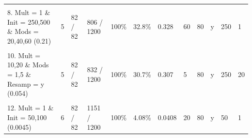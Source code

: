 \documentclass[
]{article}
\begin{document}
\begin{table}[!h]
{\begin{tabular}[t]{llllllllllll}
\cellcolor{gray!6}{7. Mult = 10,20 \& Mods = 10,20,40,60 \& Resamp = y \& Init = 50,100 (0.23)} & \cellcolor{gray!6}{7} & \cellcolor{gray!6}{82 / 82} & \cellcolor{gray!6}{948 / 1200} & \cellcolor{gray!6}{100\%} & \cellcolor{gray!6}{21\%} & \cellcolor{gray!6}{0.21} & \cellcolor{gray!6}{10} & \cellcolor{gray!6}{90} & \cellcolor{gray!6}{y} & \cellcolor{gray!6}{50} & \cellcolor{gray!6}{20}\\
8. Mult = 1 \& Init = 250,500 \& Mods = 20,40,60 (0.21) & 5 & 82 / 82 & 806 / 1200 & 100\% & 32.8\% & 0.328 & 60 & 80 & y & 250 & 1\\
\cellcolor{gray!6}{9. Mult = 10,20 \& Mods = 1,5 \& Resamp = n \& Mods = 1 \& Init = 50,100 (0.078)} & \cellcolor{gray!6}{6} & \cellcolor{gray!6}{82 / 82} & \cellcolor{gray!6}{1139 / 1200} & \cellcolor{gray!6}{100\%} & \cellcolor{gray!6}{5.08\%} & \cellcolor{gray!6}{0.0508} & \cellcolor{gray!6}{1} & \cellcolor{gray!6}{90} & \cellcolor{gray!6}{n} & \cellcolor{gray!6}{50} & \cellcolor{gray!6}{20}\\
10. Mult = 10,20 \& Mods = 1,5 \& Resamp = y (0.054) & 5 & 82 / 82 & 832 / 1200 & 100\% & 30.7\% & 0.307 & 5 & 80 & y & 250 & 20\\
\addlinespace
\cellcolor{gray!6}{11. Mult = 1 \& Init = 250,500 \& Mods = 1,5,10 (0.025)} & \cellcolor{gray!6}{5} & \cellcolor{gray!6}{82 / 82} & \cellcolor{gray!6}{981 / 1200} & \cellcolor{gray!6}{100\%} & \cellcolor{gray!6}{18.2\%} & \cellcolor{gray!6}{0.182} & \cellcolor{gray!6}{10} & \cellcolor{gray!6}{90} & \cellcolor{gray!6}{y} & \cellcolor{gray!6}{500} & \cellcolor{gray!6}{1}\\
12. Mult = 1 \& Init = 50,100 (0.0045) & 6 & 82 / 82 & 1151 / 1200 & 100\% & 4.08\% & 0.0408 & 20 & 80 & y & 50 & 1\\
\bottomrule
\end{tabular}}
\end{table}
\end{document}

